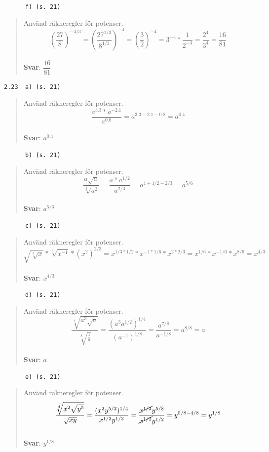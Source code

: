 \documentclass[a4paper]{article}
\newcommand{\tskcol}[1]{\textcolor{tskcol}{#1}}
\begin{document}
	\texttt{\tskcol{~~~~~~f) (s. 21)}}
	\begin{quotation}
		\noindent
		Använd räkneregler för potenser.
		\[\left(\frac{27}{8}\right)^{-4/3}=
		\left(\frac{27^{1/3}}{8^{1/3}}\right)^{-4}=
		\left(\frac{3}{2}\right)^{-4}=
		3^{-4}*\frac{1}{2^{-4}}=
		\frac{2^4}{3^4}=
		\frac{16}{81}\]
		\\
		\textbf{Svar}: $\dfrac{16}{81}$
	\end{quotation}
	
	\texttt{\tskcol{2.23~~a) (s. 21)}}
	\begin{quotation}
		\noindent
		Använd räkneregler för potenser.
		\[\frac{a^{3.3}*a^{-2.1}}{a^{0.8}}=a^{3.3-2.1-0.8}=a^{0.4}\]
		\\
		\textbf{Svar}: $a^{0.4}$
	\end{quotation}
	
	\texttt{\tskcol{~~~~~~b) (s. 21)}}
	\begin{quotation}
		\noindent
		Använd räkneregler för potenser.
		\[\dfrac{a\sqrt{a}}{\sqrt[3]{a^2}}=
		\dfrac{a*a^{1/2}}{a^{2/3}}=
		a^{1+1/2-2/3}=
		a^{5/6}\]
		\\
		\textbf{Svar}: $a^{5/6}$
	\end{quotation}
	
	\texttt{\tskcol{~~~~~~c) (s. 21)}}
	\begin{quotation}
		\noindent
		Använd räkneregler för potenser.
		\[\sqrt{\sqrt[3]{x}}*\sqrt[6]{x^{-1}}*(x^2)^{2/3}=
		x^{1/3*1/2}*x^{-1*1/6}*x^{2*2/3}=
		x^{1/6}*x^{-1/6}*x^{8/6}=
		x^{4/3}\]
		\\
		\textbf{Svar}: $x^{4/3}$
	\end{quotation}
	
	\texttt{\tskcol{~~~~~~d) (s. 21)}}
	\begin{quotation}
		\noindent
		Använd räkneregler för potenser.
		\[\dfrac{\sqrt[4]{a^3\sqrt{a}}}{\sqrt[8]{\frac{1}{a}}}=
		\dfrac{(a^3a^{1/2})^{1/4}}{(a^{-1})^{1/8}}=
		\dfrac{a^{7/8}}{a^{-1/8}}=
		a^{8/8}=
		a\]
		\\
		\textbf{Svar}: $a$
	\end{quotation}
	
	\texttt{\tskcol{~~~~~~e) (s. 21)}}
	\begin{quotation}
		\noindent
		Använd räkneregler för potenser.
		\[\dfrac{\sqrt[4]{x^2\sqrt{y^5}}}{\sqrt{xy}}=
		\dfrac{(x^2y^{5/2})^{1/4}}{x^{1/2}y^{1/2}}=
		\dfrac{\cancel{x^{1/2}}y^{5/8}}{\cancel{x^{1/2}}y^{1/2}}=
		y^{5/8-4/8}=
		y^{1/8}\]
		\\
		\textbf{Svar}: $y^{1/8}$
	\end{quotation}
	
\end{document}
